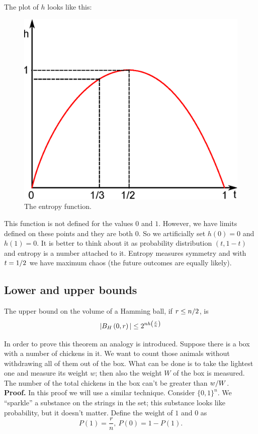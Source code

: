 The plot of $h$ looks like this:
\begin{figure}[h]
	\centering
	\includegraphics[width=0.6\linewidth]{pictures/ch01-i00.eps}
	\caption{The entropy function.}
\end{figure}

This function is not defined for the values $0$ and $1$. However, we have limits defined on these points and they are both $0$. So we artificially set $h(0) = 0$ and $h(1) = 0$. It is better to think about it as probability distribution $(t, 1 - t)$ and entropy is a number attached to it. Entropy measures symmetry and with $t = {1}/{2}$ we have maximum chaos (the future outcomes are equally likely).

\subsection{Lower and upper bounds}

\begin{thm}
	The upper bound on the volume of a Hamming ball, if $ r \leq {n}/{2}$, is
	$$|B_H\left(0, r\right)| \leq 2^{nh\left(\frac{r}{n}\right)}$$
\end{thm}

In order to prove this theorem an analogy is introduced. Suppose there is a box with a number of chickens in it. We want to count those animals without withdrawing all of them out of the box. What can be done is to take the lightest one and measure its weight $w$; then also the weight $W$ of the box is measured. The number of the total chickens in the box can't be greater than ${w}/{W}$.\\

\noindent\textbf{Proof.} In this proof we will use a similar technique. Consider $\{0, 1\}^n$. We ``sparkle'' a substance on the strings in the set; this substance looks like probability, but it doesn't matter. Define the weight of $1$ and $0$ as 
$$P(1) = \dfrac{r}{n},\ P(0) = 1 - P(1).$$

